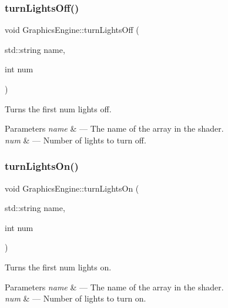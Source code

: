 \subsubsection{\texorpdfstring{turn\+Lights\+Off()}{turnLightsOff()}}
{\footnotesize\ttfamily void Graphics\+Engine\+::turn\+Lights\+Off (\begin{DoxyParamCaption}\item[{std\+::string}]{name,  }\item[{int}]{num }\end{DoxyParamCaption})}



Turns the first num lights off. 


\begin{DoxyParams}{Parameters}
{\em name} & --- The name of the array in the shader.\\
\hline
{\em num} & --- Number of lights to turn off. \\
\hline
\end{DoxyParams}
\mbox{\label{class_graphics_engine_aa518c204407c9d1b380d200ef79952f1}} 
\subsubsection{\texorpdfstring{turn\+Lights\+On()}{turnLightsOn()}}
{\footnotesize\ttfamily void Graphics\+Engine\+::turn\+Lights\+On (\begin{DoxyParamCaption}\item[{std\+::string}]{name,  }\item[{int}]{num }\end{DoxyParamCaption})}



Turns the first num lights on. 


\begin{DoxyParams}{Parameters}
{\em name} & --- The name of the array in the shader.\\
\hline
{\em num} & --- Number of lights to turn on. \\
\hline
\end{DoxyParams}
\mbox{\label{class_graphics_engine_a26a9223f0a99980ca872a3dc0ab940e4}} 
